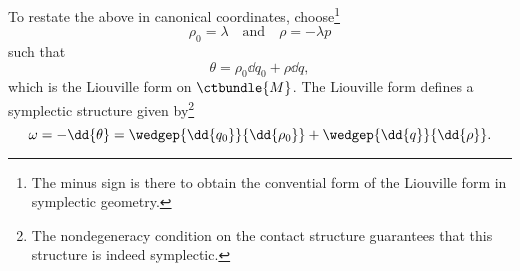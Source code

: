 To restate the above in canonical coordinates, choose\footnote
{The minus sign is there to obtain the convential form of the Liouville form in symplectic geometry.}
\begin{equation}
    \rho_0 = \lambda \quad \text{and} \quad \rho = -\lambda p
    \label{eq:homo_coords}
\end{equation}
such that
\begin{equation} 
    \theta = \rho_0\dd{q_0} + \rho\dd{q}, 
    \label{eq:dho_liouville_form}
\end{equation}
which is the Liouville form on $\ctbundle{M}$. \cite[p. 308]{Libermann1987}  The Liouville form defines a symplectic structure given by\footnote
{The nondegeneracy condition on the contact structure guarantees that this structure is indeed symplectic.}
$$\omega = -\dd{\theta} = \wedgep{\dd{q_0}}{\dd{\rho_0}} + \wedgep{\dd{q}}{\dd{\rho}}.$$ 

